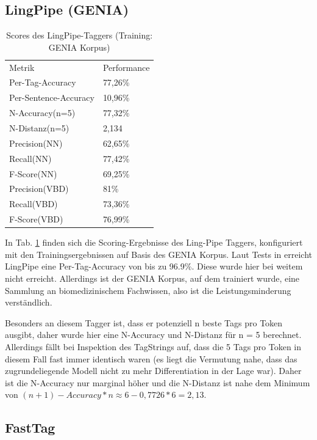 \subsection{LingPipe (GENIA)}
\label{sec:eval:detail:lingpipe}

\begin{table}[htb]
\centering
\captionsetup{justification=centering,margin=2cm}
\begin{tabular}{l|l}
Metrik & Performance \\
\cline{1-2}
Per-Tag-Accuracy & 77,26\%\\
Per-Sentence-Accuracy & 10,96\%\\
\cline{1-2}
N-Accuracy(n=5) & 77,32\%\\
N-Distanz(n=5) & 2,134\\
\cline{1-2}
Precision(NN) & 62,65\%\\
Recall(NN) & 77,42\%\\
F-Score(NN) & 69,25\%\\
\cline{1-2}
Precision(VBD) & 81\%\\
Recall(VBD) & 73,36\%\\
F-Score(VBD) & 76,99\%
\end{tabular}
\vspace{3mm}
\caption{Scores des LingPipe-Taggers (Training: GENIA Korpus)}
\label{tab:eval:detail:lingpipe}
\end{table}

In Tab. \ref{tab:eval:detail:lingpipe} finden sich die Scoring-Ergebnisse des Ling-Pipe Taggers, konfiguriert mit den Trainingsergebnissen auf Basis des GENIA Korpus. Laut Tests in \cite{Lingpipeeval} erreicht LingPipe eine Per-Tag-Accuracy von bis zu 96.9\%. Diese wurde hier bei weitem nicht erreicht. Allerdings ist der GENIA Korpus, auf dem trainiert wurde, eine Sammlung an biomedizinischem Fachwissen, also ist die Leistungsminderung verständlich. 

Besonders an diesem Tagger ist, dass er potenziell n beste Tags pro Token ausgibt, daher wurde hier eine N-Accuracy und N-Distanz für n = 5 berechnet. Allerdings fällt bei Inspektion des TagStrings auf, dass die 5 Tags pro Token in diesem Fall fast immer identisch waren (es liegt die Vermutung nahe, dass das zugrundeliegende Modell nicht zu mehr Differentiation in der Lage war). Daher ist die N-Accuracy nur marginal höher und die N-Distanz ist nahe dem Minimum von $(n+1)-Accuracy*n\approx 6-0,7726*6=2,13$.

\subsection{FastTag}
\label{sec:eval:detail:fasttag}

